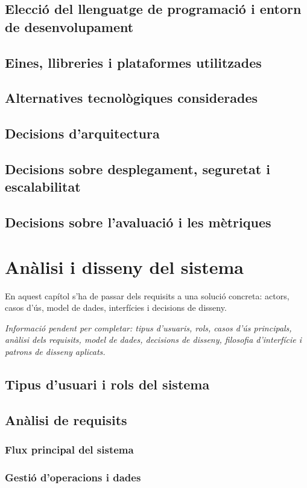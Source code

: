 \documentclass[11pt,a4paper]{article}
\newcommand{\requiredinfo}[1]{%
  \vspace{0.4em}%
  {\color{placeholdergray}\textit{Informaci\'o pendent per completar: #1.}}\par
}
\newcommand{\sectionintro}[1]{%
  \vspace{0.25em}%
  #1\par
}
\begin{document}
\subsection{Elecci\'o del llenguatge de programaci\'o i entorn de desenvolupament}
\subsection{Eines, llibreries i plataformes utilitzades}
\subsection{Alternatives tecnol\`ogiques considerades}
\subsection{Decisions d'arquitectura}
\subsection{Decisions sobre desplegament, seguretat i escalabilitat}
\subsection{Decisions sobre l'avaluaci\'o i les m\`etriques}

\section{An\`alisi i disseny del sistema}
\sectionintro{En aquest cap\'itol s'ha de passar dels requisits a una soluci\'o concreta: actors, casos d'\'us, model de dades, interf\'icies i decisions de disseny.}\requiredinfo{tipus d'usuaris, rols, casos d'\'us principals, an\`alisi dels requisits, model de dades, decisions de disseny, filosofia d'interf\'icie i patrons de disseny aplicats}

\subsection{Tipus d'usuari i rols del sistema}
\subsection{An\`alisi de requisits}
\subsubsection{Flux principal del sistema}
\subsubsection{Gesti\'o d'operacions i dades}
\end{document}
